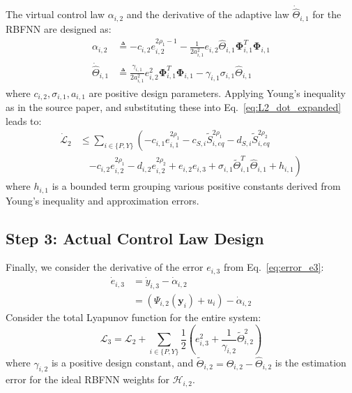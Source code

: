 The virtual control law $\alpha_{i,2}$ and the derivative of the  adaptive law $\dot{\widehat{\Theta}}_{i,1}$ for the RBFNN are designed as:
\begin{align}
    \alpha_{i,2} &\triangleq  - c_{i,2} e_{i,2}^{2\rho_1-1} - \frac{1}{2a_{i,1}^2} e_{i,2} \widehat{\Theta}_{i,1} \mathbf{\Phi}_{i,1}^T \mathbf{\Phi}_{i,1} \label{eq:alpha2} \\
    \dot{\widehat{\Theta}}_{i,1} &\triangleq \frac{\gamma_{i,1}}{2a_{i,1}^2} e_{i,2}^2 \mathbf{\Phi}_{i,1}^T \mathbf{\Phi}_{i,1} - \gamma_{i,1} \sigma_{i,1} \widehat{\Theta}_{i,1} \label{eq:W1_hat_dot}
\end{align}
where $c_{i,2}, \sigma_{i,1}, a_{i,1}$ are positive design parameters. Applying Young's inequality as in the source paper, and substituting these into Eq.~\eqref{eq:L2_dot_expanded} leads to:
\begin{align}
    \dot{\mathcal{L}}_2 &\le \sum_{i \in \{P,Y\}} \left( -c_{i,1} e_{i,1}^{2\rho_1} - c_{S,i} \widetilde{S}_{i,eq}^{2\rho_1} - d_{S,i} \widetilde{S}_{i,eq}^{2\rho_2}  \right. \nonumber \\
    &\quad \left. - c_{i,2} e_{i,2}^{2\rho_1} - d_{i,2} e_{i,2}^{2\rho_2} + e_{i,2} e_{i,3} + \sigma_{i,1} \widetilde{\Theta}_{i,1}^T \widehat{\Theta}_{i,1} + h_{i,1} \right) \label{eq:L2_dot_simplified}
\end{align}
where $h_{i,1}$ is a bounded term grouping various positive constants derived from Young's inequality and approximation errors.

\subsection{Step 3: Actual Control Law Design}
Finally, we consider the derivative of the error $e_{i,3}$ from Eq.~\eqref{eq:error_e3}:
\begin{align}
    \dot{e}_{i,3} &= \dot{y}_{i,3} - \dot{\alpha}_{i,2} \nonumber \\
    &= \left( \Psi_{i,2}(\mathbf{y}_i) +  u_i \right) - \dot{\alpha}_{i,2} \label{eq:e3_dot_expanded}
\end{align}
Consider the total Lyapunov function for the entire system:
\begin{equation}
    \mathcal{L}_3 = \mathcal{L}_2 + \sum_{i \in \{P,Y\}} \frac{1}{2} \left( e_{i,3}^2 + \frac{1}{\gamma_{i,2}} \widetilde{\Theta}_{i,2}^2 \right) \label{eq:lyapunov_L3}
\end{equation}
where $\gamma_{i,2}$ is a positive design constant, and $\widetilde{\Theta}_{i,2} = \Theta_{i,2} - \widehat{\Theta}_{i,2}$ is the estimation error for the ideal RBFNN weights for $\mathcal{H}_{i,2}$.

